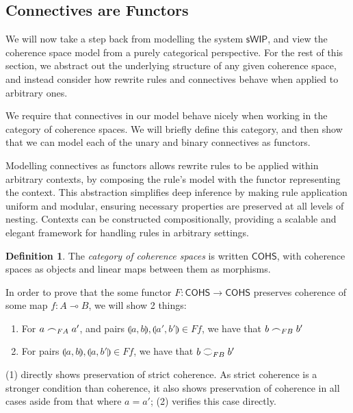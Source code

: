 \documentclass[11pt, oneside]{article}
\theoremstyle{plain}
\theoremstyle{definition}
\newtheorem{definition}[theorem]{Definition}
\newcommand{\lp}{\llparenthesis}
\newcommand{\rp}{\rrparenthesis}
\newcommand{\sSys}{{\mathsf{sWIP}}}%
\newcommand{\cohs}{{\mathsf{COHS}}}
\newcommand{\coh}[1][]{\mathrel{\vcenter{\offinterlineskip\hbox{$\frown$}\vskip0.2ex\hbox{$\smile$}}_{\ifx\\#1\\\else#1\fi}}}
\newcommand{\scoh}[1][]{\mathrel{\frown}_{\ifx\\#1\\\else#1\fi}}
\begin{document}
\subsection{Connectives are Functors}

We will now take a step back from modelling the system $\sSys$, and view the coherence space model from a purely categorical perspective.
For the rest of this section, we abstract out the underlying structure of any given coherence space, and instead consider how rewrite rules and connectives behave when applied to arbitrary ones.

We require that connectives in our model behave nicely when working in the category of coherence spaces.
We will briefly define this category, and then show that we can model each of the unary and binary connectives as functors.

Modelling connectives as functors allows rewrite rules to be applied within arbitrary contexts, by composing the rule's model with the functor representing the context.
This abstraction simplifies deep inference by making rule application uniform and modular, ensuring necessary properties are preserved at all levels of nesting.
Contexts can be constructed compositionally, providing a scalable and elegant framework for handling rules in arbitrary settings.

\begin{definition}
    The \textit{category of coherence spaces} is written $\cohs$, with coherence spaces as objects and linear maps between them as morphisms.
\end{definition}

In order to prove that the some functor $F:\cohs\to\cohs$ preserves coherence of some map $f:A\multimap B$, we will show 2 things:
\begin{enumerate}
    \item
    For $a\scoh[FA]a'$, and pairs $\lp a,b\rp,\lp a',b'\rp\in Ff$, we have that $b\scoh[FB]b'$
    \item 
    For pairs $\lp a,b\rp,\lp a,b'\rp\in Ff$, we have that $b\coh[FB]b'$
\end{enumerate}
(1) directly shows preservation of strict coherence. As strict coherence is a stronger condition than coherence, it also shows preservation of coherence in all cases aside from that where $a=a'$;
(2) verifies this case directly.
\end{document}
